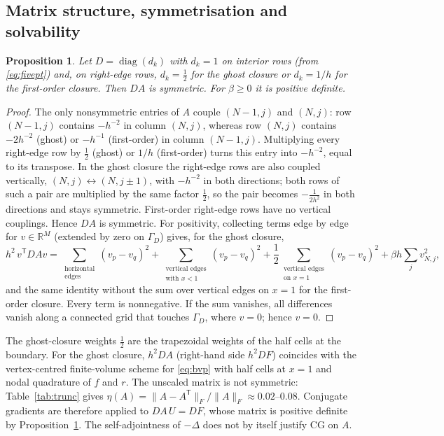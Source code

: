 \documentclass[11pt,a4paper]{article}
\theoremstyle{palplain}
\newtheorem{proposition}[theorem]{Proposition}
\theoremstyle{paldef}
\theoremstyle{palremark}
\newcommand{\GD}{\Gamma_D}
\begin{document}
\subsection{Matrix structure, symmetrisation and solvability}\label{sec:matrix}
\begin{proposition}\label{prop:sym}
Let $D=\operatorname{diag}(d_k)$ with $d_k=1$ on interior rows (from \eqref{eq:fivept}) and, on right-edge rows,
$d_k=\tfrac12$ for the ghost closure or $d_k=1/h$ for the first-order closure. Then $DA$ is
symmetric. For $\beta\ge0$ it is positive definite.
\end{proposition}
\begin{proof}
The only nonsymmetric entries of $A$ couple $(N-1,j)$ and $(N,j)$: row $(N-1,j)$ contains
$-h^{-2}$ in column $(N,j)$, whereas row $(N,j)$ contains $-2h^{-2}$ (ghost) or $-h^{-1}$
(first-order) in column $(N-1,j)$. Multiplying every right-edge row by $\tfrac12$ (ghost) or
$1/h$ (first-order) turns this entry into $-h^{-2}$, equal to its transpose. In the ghost
closure the right-edge rows are also coupled vertically, $(N,j)\leftrightarrow(N,j\pm1)$, with
$-h^{-2}$ in both directions; both rows of such a pair are multiplied by the same factor
$\tfrac12$, so the pair becomes $-\tfrac{1}{2h^{2}}$ in both directions and stays symmetric.
First-order right-edge rows have no vertical couplings. Hence $DA$ is symmetric. For positivity, collecting terms edge by edge for $v\in\mathbb R^M$
(extended by zero on $\GD$) gives, for the ghost closure,
\[
h^2\,v^{\mathsf T}DAv=\sum_{\substack{\text{horizontal}\\\text{edges}}}(v_p-v_q)^2
+\sum_{\substack{\text{vertical edges}\\\text{with }x<1}}(v_p-v_q)^2
+\frac12\sum_{\substack{\text{vertical edges}\\\text{on }x=1}}(v_p-v_q)^2+\beta h\sum_{j}v_{N,j}^2 ,
\]
and the same identity without the sum over vertical edges on $x=1$ for the first-order
closure. Every term is nonnegative. If the sum vanishes, all differences
vanish along a connected grid that touches $\GD$, where $v=0$; hence $v=0$.
\end{proof}
The ghost-closure weights $\tfrac12$ are the trapezoidal weights of the half cells at the
boundary. For the ghost closure, $h^2DA$ (right-hand side $h^2DF$) coincides with the
vertex-centred finite-volume scheme for \eqref{eq:bvp} with half cells at $x=1$ and nodal
quadrature of $f$ and $r$. The unscaled matrix is not
symmetric: Table~\ref{tab:trunc} gives
$\eta(A)=\|A-A^{\mathsf T}\|_F/\|A\|_F\approx0.02$--$0.08$. Conjugate gradients are therefore
applied to $DA\,U=DF$, whose matrix is positive definite by Proposition~\ref{prop:sym}. The
self-adjointness of $-\Delta$ does not by itself justify CG on $A$.
\end{document}
